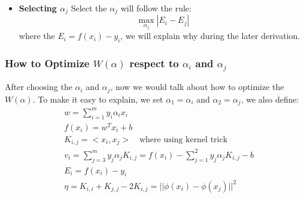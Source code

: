 \documentclass[a4paper]{article}
\begin{document}
\begin{itemize}
\item{\textbf{Selecting $\alpha_j$}
Select the $\alpha_j$ will follow the rule:
$$
\max_{\alpha_j}|E_i - E_j|
$$
where the $E_i = f(x_i) - y_i$, we will explain why during the later derivation. 
} 
\end{itemize}

\subsubsection{How to Optimize $W(\alpha)$ respect to $\alpha_i$ and $\alpha_j$}
After choosing the $\alpha_i$ and $\alpha_j$, now we would talk about how to optimize the $W(\alpha)$. To make it easy to explain, we set $\alpha_1 = \alpha_i$ and $\alpha_2 = \alpha_j$, we also define:
\begin{align}
&w = \sum_{i=1}^{m}y_i \alpha_i x_i \\
&f(x_i) = w^T x_i + b \\
&K_{i,j} = <x_i, x_j> \quad \text{where using kernel trick} \\
&v_i = \sum_{j=3}^{m} y_j \alpha_j K_{i,j} = f(x_i) - \sum_{j=1}^{2} y_j \alpha_j K_{i,j} - b \\
&E_i = f(x_i) - y_i \\ 
&\eta = K_{i,i} + K_{j,j} - 2K_{i,j} = || \phi(x_i) - \phi(x_j)||^2 
\end{align}
\end{document}
